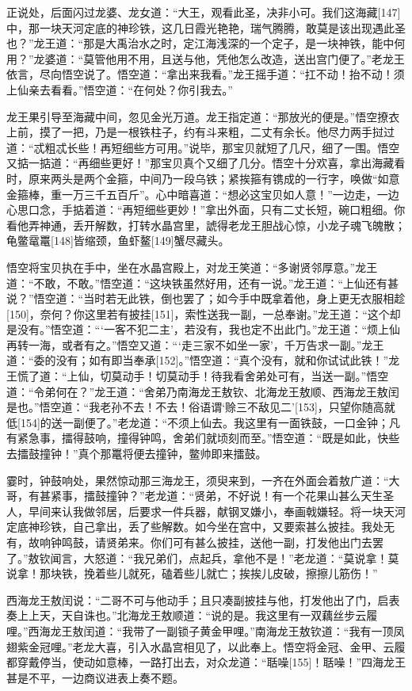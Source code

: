 \documentclass[12pt,UTF8]{ctexbook}
\begin{document}
正说处，后面闪过龙婆、龙女道：“大王，观看此圣，决非小可。我们这海藏[147]中，那一块天河定底的神珍铁，这几日霞光艳艳，瑞气腾腾，敢莫是该出现遇此圣也？”龙王道：“那是大禹治水之时，定江海浅深的一个定子，是一块神铁，能中何用？”龙婆道：“莫管他用不用，且送与他，凭他怎么改造，送出宫门便了。”老龙王依言，尽向悟空说了。悟空道：“拿出来我看。”龙王摇手道：“扛不动！抬不动！须上仙亲去看看。”悟空道：“在何处？你引我去。”

龙王果引导至海藏中间，忽见金光万道。龙王指定道：“那放光的便是。”悟空撩衣上前，摸了一把，乃是一根铁柱子，约有斗来粗，二丈有余长。他尽力两手挝过道：“忒粗忒长些！再短细些方可用。”说毕，那宝贝就短了几尺，细了一围。悟空又掂一掂道：“再细些更好！”那宝贝真个又细了几分。悟空十分欢喜，拿出海藏看时，原来两头是两个金箍，中间乃一段乌铁；紧挨箍有镌成的一行字，唤做“如意金箍棒，重一万三千五百斤”。心中暗喜道：“想必这宝贝如人意！”一边走，一边心思口念，手掂着道：“再短细些更妙！”拿出外面，只有二丈长短，碗口粗细。你看他弄神通，丢开解数，打转水晶宫里，諕得老龙王胆战心惊，小龙子魂飞魄散；龟鳖鼋鼍[148]皆缩颈，鱼虾鳌[149]蟹尽藏头。

悟空将宝贝执在手中，坐在水晶宫殿上，对龙王笑道：“多谢贤邻厚意。”龙王道：“不敢，不敢。”悟空道：“这块铁虽然好用，还有一说。”龙王道：“上仙还有甚说？”悟空道：“当时若无此铁，倒也罢了；如今手中既拿着他，身上更无衣服相趁[150]，奈何？你这里若有披挂[151]，索性送我一副，一总奉谢。”龙王道：“这个却是没有。”悟空道：“‘一客不犯二主’，若没有，我也定不出此门。”龙王道：“烦上仙再转一海，或者有之。”悟空又道：“‘走三家不如坐一家’，千万告求一副。”龙王道：“委的没有；如有即当奉承[152]。”悟空道：“真个没有，就和你试试此铁！”龙王慌了道：“上仙，切莫动手！切莫动手！待我看舍弟处可有，当送一副。”悟空道：“令弟何在？”龙王道：“舍弟乃南海龙王敖钦、北海龙王敖顺、西海龙王敖闰是也。”悟空道：“我老孙不去！不去！俗语谓‘赊三不敌见二’[153]，只望你随高就低[154]的送一副便了。”老龙道：“不须上仙去。我这里有一面铁鼓，一口金钟；凡有紧急事，擂得鼓响，撞得钟鸣，舍弟们就顷刻而至。”悟空道：“既是如此，快些去擂鼓撞钟！”真个那鼍将便去撞钟，鳖帅即来擂鼓。

霎时，钟鼓响处，果然惊动那三海龙王，须臾来到，一齐在外面会着敖广道：“大哥，有甚紧事，擂鼓撞钟？”老龙道：“贤弟，不好说！有一个花果山甚么天生圣人，早间来认我做邻居，后要求一件兵器，献钢叉嫌小，奉画戟嫌轻。将一块天河定底神珍铁，自己拿出，丢了些解数。如今坐在宫中，又要索甚么披挂。我处无有，故响钟鸣鼓，请贤弟来。你们可有甚么披挂，送他一副，打发他出门去罢了。”敖钦闻言，大怒道：“我兄弟们，点起兵，拿他不是！”老龙道：“莫说拿！莫说拿！那块铁，挽着些儿就死，磕着些儿就亡；挨挨儿皮破，擦擦儿筋伤！”

西海龙王敖闰说：“二哥不可与他动手；且只凑副披挂与他，打发他出了门，启表奏上上天，天自诛也。”北海龙王敖顺道：“说的是。我这里有一双藕丝步云履哩。”西海龙王敖闰道：“我带了一副锁子黄金甲哩。”南海龙王敖钦道：“我有一顶凤翅紫金冠哩。”老龙大喜，引入水晶宫相见了，以此奉上。悟空将金冠、金甲、云履都穿戴停当，使动如意棒，一路打出去，对众龙道：“聒噪[155]！聒噪！”四海龙王甚是不平，一边商议进表上奏不题。
\end{document}
